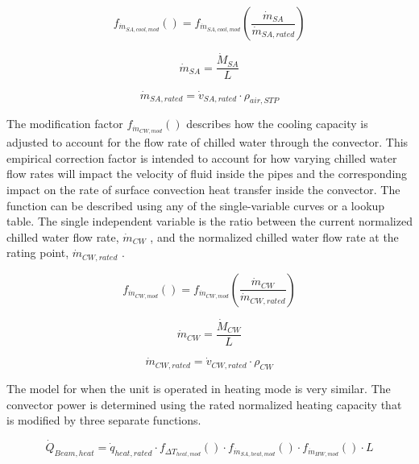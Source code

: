 \begin{equation}
  {f_{\dot m_{SA,cool,mod}}()} = f_{\dot m_{SA,cool,mod}}\left(\frac{{\dot m_{SA}}}{{\dot m_{SA,rated}} }\right)
\end{equation}

\begin{equation}
  {\dot m_{SA}} = \frac{\dot M_{SA}}{L}
\end{equation}

\begin{equation}
  {\dot m_{SA,rated}} = {\dot v_{SA,rated}} \cdot {\rho_{air,STP}}
\end{equation}

The modification factor \(f_{\dot m_{CW,mod}}()\) describes how the cooling capacity is adjusted to account for the flow rate of chilled water through the convector. This empirical correction factor is intended to account for how varying chilled water flow rates will impact the velocity of fluid inside the pipes and the corresponding impact on the rate of surface convection heat transfer inside the convector. The function can be described using any of the single-variable curves or a lookup table. The single independent variable is the ratio between the current normalized chilled water flow rate, \({\dot m_{CW}}\) , and the normalized chilled water flow rate at the rating point, \({\dot m_{CW,rated}}\) .

\begin{equation}
  {f_{\dot m_{CW,mod}}()} = f_{\dot m_{CW,mod}}\left(\frac{{\dot m_{CW}}}{{\dot m_{CW,rated}}}\right)
\end{equation}

\begin{equation}
  {\dot m_{CW}} = \frac{\dot M_{CW}}{L}
\end{equation}

\begin{equation}
  {\dot m_{CW,rated}} = {\dot v_{CW,rated}} \cdot {\rho_{CW}}
\end{equation}

The model for when the unit is operated in heating mode is very similar. The convector power is determined using the rated normalized heating capacity that is modified by three separate functions.

\begin{equation}
{\dot Q_{Beam, heat}} = {\dot q_{heat,rated}}\cdot f_{ \Delta T_{heat,mod} }() \cdot f_{\dot m_{SA,heat,mod}}()\cdot f_{\dot m_{HW,mod}}() \cdot L
\end{equation}

